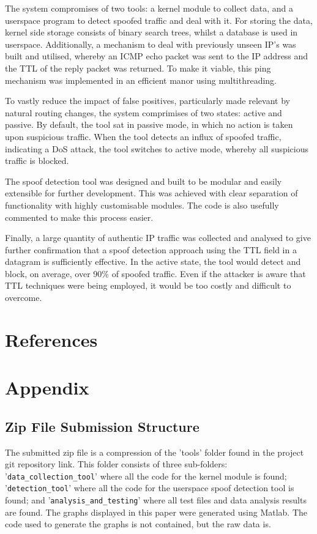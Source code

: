 \documentclass[12pt,twoside]{article}
\begin{document}
The system compromises of two tools: a kernel module to collect data, and a userspace program to detect spoofed traffic and deal with it. For storing the data, kernel side storage consists of binary search trees, whilst a database is used in userspace. Additionally, a mechanism to deal with previously unseen IP's was built and utilised, whereby an ICMP echo packet was sent to the IP address and the TTL of the reply packet was returned. To make it viable, this ping mechanism was implemented in an efficient manor using multithreading.

To vastly reduce the impact of false positives, particularly made relevant by natural routing changes, the system comprimises of two states: active and passive. By default, the tool sat in passive mode, in which no action is taken upon suspicious traffic. When the tool detects an influx of spoofed traffic, indicating a DoS attack, the tool switches to active mode, whereby all suspicious traffic is blocked.

The spoof detection tool was designed and built to be modular and easily extensible for further development. This was achieved with clear separation of functionality with highly customisable modules. The code is also usefully commented to make this process easier.

Finally, a large quantity of authentic IP traffic was collected and analysed to give further confirmation that a spoof detection approach using the TTL field in a datagram is sufficiently effective. In the active state, the tool would detect and block, on average, over 90\% of spoofed traffic. Even if the attacker is aware that TTL techniques were being employed, it would be too costly and difficult to overcome.

\section{References}



\newpage
\section{Appendix}
\subsection{Zip File Submission Structure}
The submitted zip file is a compression of the 'tools' folder found in the project git repository link. This folder consists of three sub-folders: '\texttt{data\_collection\_tool}' where all the code for the kernel module is found; '\texttt{detection\_tool}' where all the code for the userspace spoof detection tool is found; and '\texttt{analysis\_and\_testing}' where all test files and data analysis results are found. The graphs displayed in this paper were generated using Matlab. The code used to generate the graphs is not contained, but the raw data is.
\end{document}
